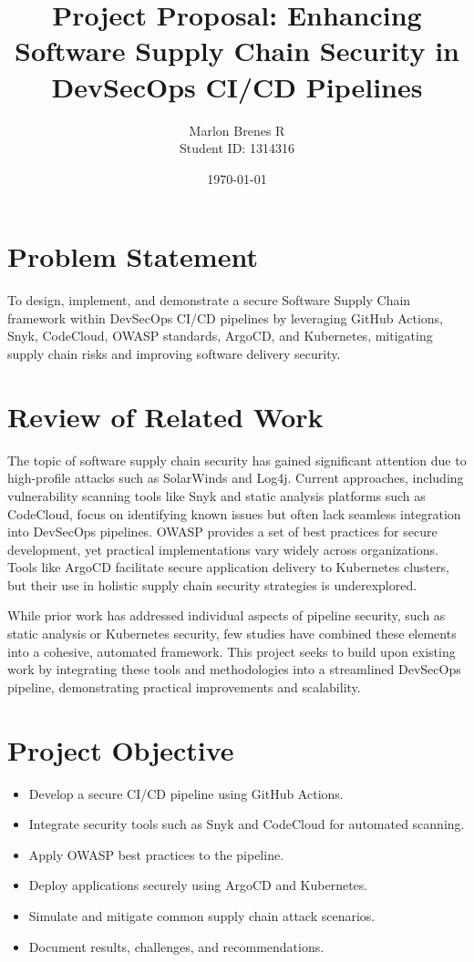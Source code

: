 \documentclass[a4paper,12pt]{article}
\title{Project Proposal: Enhancing Software Supply Chain Security in DevSecOps CI/CD Pipelines}
\author{Marlon Brenes R \\
        Student ID: 1314316}
\date{\today}
\begin{document}
\maketitle

\section{Problem Statement}
To design, implement, and demonstrate a secure Software Supply Chain framework within DevSecOps CI/CD pipelines by leveraging GitHub Actions, Snyk, CodeCloud, OWASP standards, ArgoCD, and Kubernetes, mitigating supply chain risks and improving software delivery security.

\section{Review of Related Work}
The topic of software supply chain security has gained significant attention due to high-profile attacks such as SolarWinds and Log4j. Current approaches, including vulnerability scanning tools like Snyk and static analysis platforms such as CodeCloud, focus on identifying known issues but often lack seamless integration into DevSecOps pipelines. OWASP provides a set of best practices for secure development, yet practical implementations vary widely across organizations. Tools like ArgoCD facilitate secure application delivery to Kubernetes clusters, but their use in holistic supply chain security strategies is underexplored.

While prior work has addressed individual aspects of pipeline security, such as static analysis or Kubernetes security, few studies have combined these elements into a cohesive, automated framework. This project seeks to build upon existing work by integrating these tools and methodologies into a streamlined DevSecOps pipeline, demonstrating practical improvements and scalability.

\section{Project Objective}
\begin{itemize}
    \item Develop a secure CI/CD pipeline using GitHub Actions.
    \item Integrate security tools such as Snyk and CodeCloud for automated scanning.
    \item Apply OWASP best practices to the pipeline.
    \item Deploy applications securely using ArgoCD and Kubernetes.
    \item Simulate and mitigate common supply chain attack scenarios.
    \item Document results, challenges, and recommendations.
\end{itemize}
\end{document}
